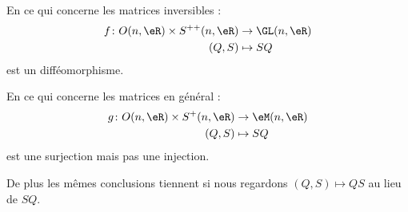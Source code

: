 \begin{theorem} \label{ThoLHebUAU}
   En ce qui concerne les matrices inversibles :
   \begin{equation}
       \begin{aligned}
           f\colon O(n,\eR)\times S^{++}(n,\eR)&\to \GL(n,\eR) \\
           (Q,S)&\mapsto SQ 
       \end{aligned}
   \end{equation}
   est un difféomorphisme.

   En ce qui concerne les matrices en général :
   \begin{equation}
       \begin{aligned}
           g\colon O(n,\eR)\times S^+(n,\eR)&\to \eM(n,\eR) \\
           (Q,S)&\mapsto SQ 
       \end{aligned}
   \end{equation}
   est une surjection mais pas une injection.

   De plus les mêmes conclusions tiennent si nous regardons \( (Q,S)\mapsto QS\) au lieu de \( SQ\).
\end{theorem}


